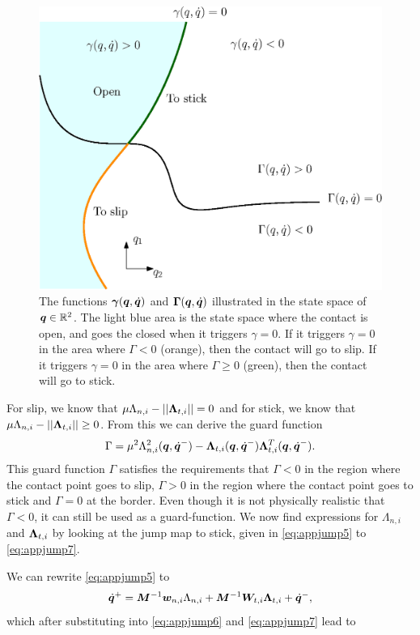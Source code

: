 \documentclass[DC2017114Bouma.tex]{subfiles}
\begin{document}
\begin{figure}[H]
	\centering
	\includegraphics[width=.7\textwidth]{guardopcl.eps}\caption{The functions $\boldsymbol{\gamma}({\boldsymbol{q}},\dot{{\boldsymbol{q}}})$ and $\boldsymbol{\Gamma}({\boldsymbol{q}},\dot{{\boldsymbol{q}}})$ illustrated in the state space of ${\boldsymbol{q}}\in\mathbb{R}^{2}$. The light blue area is the state space where the contact is open, and goes the closed when it triggers $\gamma = 0$. If it triggers $\gamma = 0$ in the area where $\Gamma<0$ (orange), then the contact will go to slip. If it triggers $\gamma=0$ in the area where $\Gamma\geq 0$ (green), then the contact will go to stick.}\label{fig:guardopcl}
\end{figure}

For slip, we know that $\mu\Lambda_{n,i} - ||\boldsymbol{\Lambda}_{t,i}|| = 0$ and for stick, we know that  $\mu\Lambda_{n,i} - ||\boldsymbol{\Lambda}_{t,i}|| \geq 0$. From this we can derive the guard function
\begin{align}
\Gamma = \mu^2 \Lambda_{n,i}^2({\boldsymbol{q}},\dot{{\boldsymbol{q}}}^-) - \boldsymbol{\Lambda}_{t,i}({\boldsymbol{q}},\dot{{\boldsymbol{q}}}^-)\boldsymbol{\Lambda}_{t,i}^T({\boldsymbol{q}},\dot{{\boldsymbol{q}}}^-). \label{eq:slipset}
\end{align}
This guard function $\Gamma$ satisfies the requirements that $\Gamma<0$ in the region where the contact point goes to slip, $\Gamma > 0$ in the region where the contact point goes to stick and $\Gamma = 0$ at the border. Even though it is not physically realistic that $\Gamma < 0$, it can still be used as a guard-function.
We now find expressions for $\Lambda_{n,i}$ and $\boldsymbol{\Lambda}_{t,i}$ by looking at the jump map to stick, given in \eqref{eq:appjump5} to \eqref{eq:appjump7}.

We can rewrite \eqref{eq:appjump5} to
\begin{align}
\dot{{\boldsymbol{q}}}^+ = {\boldsymbol{M}}^{-1}{\boldsymbol{w}}_{n,i}\Lambda_{n,i} + {\boldsymbol{M}}^{-1}{\boldsymbol{W}}_{t,i}\boldsymbol{\Lambda}_{t,i} + \dot{{\boldsymbol{q}}}^-,
\end{align}
which after substituting into \eqref{eq:appjump6} and \eqref{eq:appjump7} lead to
\end{document}
